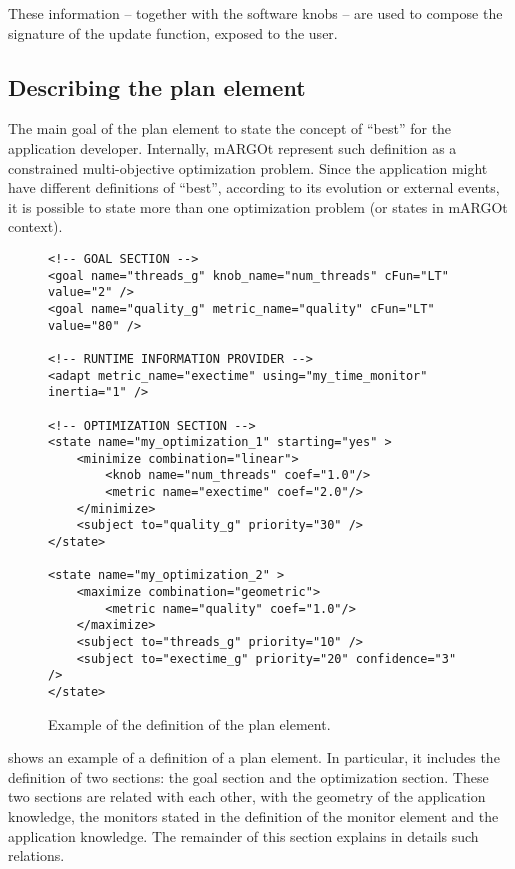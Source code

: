 These information -- together with the software knobs --  are used to compose the signature of the update function, exposed to the user.


\subsection{Describing the plan element}

The main goal of the plan element to state the concept of ``best'' for the application developer.
Internally, mARGOt represent such definition as a constrained multi-objective optimization problem.
Since the application might have different definitions of ``best'', according to its evolution or external events, it is possible to state more than one optimization problem (or states in mARGOt context). 



\begin{figure}
\lstset{language=XML}
\begin{lstlisting}
<!-- GOAL SECTION -->
<goal name="threads_g" knob_name="num_threads" cFun="LT" value="2" />
<goal name="quality_g" metric_name="quality" cFun="LT" value="80" />

<!-- RUNTIME INFORMATION PROVIDER -->
<adapt metric_name="exectime" using="my_time_monitor" inertia="1" />

<!-- OPTIMIZATION SECTION -->
<state name="my_optimization_1" starting="yes" >
	<minimize combination="linear">
		<knob name="num_threads" coef="1.0"/>
		<metric name="exectime" coef="2.0"/>
	</minimize>
	<subject to="quality_g" priority="30" />
</state>

<state name="my_optimization_2" >
	<maximize combination="geometric">
		<metric name="quality" coef="1.0"/>
	</maximize>
	<subject to="threads_g" priority="10" />
	<subject to="exectime_g" priority="20" confidence="3" />
</state>

\end{lstlisting}
\caption{Example of the definition of the plan element.}
\label{code:plan_xml}
\end{figure}

 shows an example of a definition of a plan element.
In particular, it includes the definition of two sections: the goal section and the optimization section.
These two sections are related with each other, with the geometry of the application knowledge, the monitors stated in the definition of the monitor element and the application knowledge.
The remainder of this section explains in details such relations.

